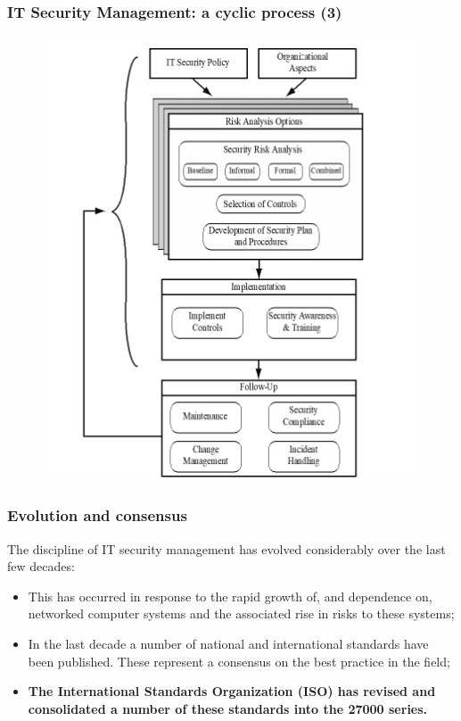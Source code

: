 \documentclass[xcolor ={table,usenames,dvipsnames}]{beamer}
\theoremstyle{definition}
\begin{document}
	\begin{frame}
		\frametitle{IT Security Management: a cyclic process (3)}
			\begin{figure}[h!]
			\centering
			\includegraphics[scale=0.40]{img/img_03.PNG}
			\label{Interfacce di un CS}
		\end{figure}
	\end{frame}
	
	\begin{frame}
		\frametitle{Evolution and consensus}
		The discipline of IT security management has evolved considerably over the last few decades:
		 
		\begin{itemize}
			\item This has occurred in response to the rapid growth of, and dependence on, networked computer systems and the associated rise in risks to these systems;
			\item In the last	decade a number of national and international standards have been published. These represent a consensus on the best practice in the field;
			\item \textbf{The International Standards Organization (ISO) has revised and consolidated a number of these standards into the 27000 series.}
		\end{itemize}
		 
	\end{frame}
\end{document}
